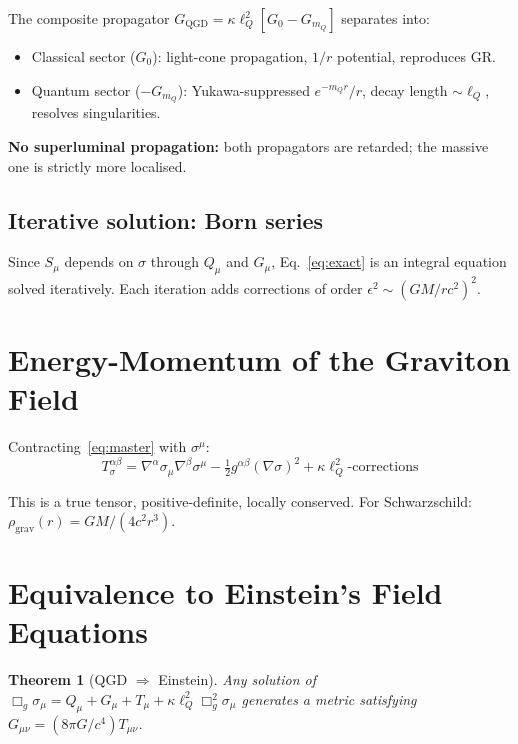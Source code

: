 \documentclass[11pt,a4paper]{article}
\theoremstyle{plain}
\newtheorem{theorem}{Theorem}[section]
\theoremstyle{definition}
\theoremstyle{remark}
\newcommand{\lQ}{\ell_Q}
\newcommand{\mQ}{m_Q}
\begin{document}
The composite propagator $G_{\mathrm{QGD}} = \kappa\lQ^2[G_0 - G_{\mQ}]$ separates into:
\begin{itemize}
  \item Classical sector ($G_0$): light-cone propagation, $1/r$ potential, reproduces GR.
  \item Quantum sector ($-G_{\mQ}$): Yukawa-suppressed $e^{-\mQ r}/r$, decay length $\sim\lQ$, resolves singularities.
\end{itemize}

\textbf{No superluminal propagation:} both propagators are retarded; the massive one is strictly more localised.

\subsection{Iterative solution: Born series}

Since $S_\mu$ depends on $\sigma$ through $Q_\mu$ and $G_\mu$, Eq.~\eqref{eq:exact} is an integral equation solved iteratively.  Each iteration adds corrections of order $\epsilon^2 \sim (GM/rc^2)^2$.

\section{Energy-Momentum of the Graviton Field}
\label{sec:energy}

Contracting~\eqref{eq:master} with $\sigma^\mu$:
\begin{equation}
  T_\sigma^{\alpha\beta} = \nabla^\alpha\sigma_\mu\nabla^\beta\sigma^\mu - \tfrac{1}{2}g^{\alpha\beta}(\nabla\sigma)^2 + \kappa\lQ^2\text{-corrections}
\end{equation}

This is a true tensor, positive-definite, locally conserved.  For Schwarzschild: $\rho_{\mathrm{grav}}(r) = GM/(4c^2 r^3)$.

\section{Equivalence to Einstein's Field Equations}
\label{sec:equivalence}

\begin{theorem}[QGD $\Rightarrow$ Einstein]\label{thm:forward}
  Any solution of $\Box_g\sigma_\mu = Q_\mu + G_\mu + T_\mu + \kappa\lQ^2\Box_g^2\sigma_\mu$ generates a metric satisfying $G_{\mu\nu} = (8\pi G/c^4)T_{\mu\nu}$.
\end{theorem}
\end{document}
